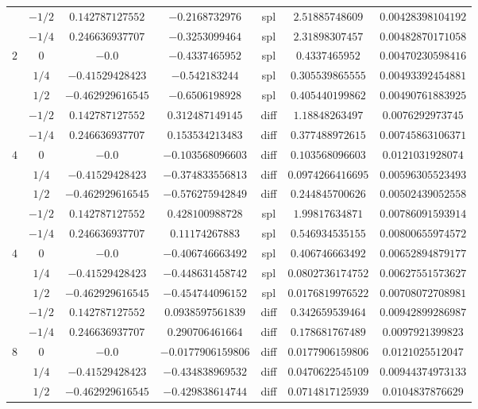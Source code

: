 \documentclass[letter, 10pt]{article}
\begin{document}
\begin{itemize}
\begin{center}
\begin{tabular}{|c|c|c|c|c|c|c|}
			& $ -1/2 $ & $ 0.142787127552 $ & $ -0.2168732976 $ &  spl  & $ 2.51885748609 $ & $ 0.00428398104192 $ \\ 
			& $ -1/4 $ & $ 0.246636937707 $ & $ -0.3253099464 $ &  spl  & $ 2.31898307457 $ & $ 0.00482870171058 $ \\ 
		$2$ & $ 0 $ & $ -0.0 $ & $ -0.4337465952 $ &  spl  & $ 0.4337465952 $ & $ 0.00470230598416 $ \\ 
			& $ 1/4 $ & $ -0.41529428423 $ & $ -0.542183244 $ &  spl  & $ 0.305539865555 $ & $ 0.00493392454881 $ \\ 
			& $ 1/2 $ & $ -0.462929616545 $ & $ -0.6506198928 $ &  spl  & $ 0.405440199862 $ & $ 0.00490761883925 $ \\ 

		\hline \hline
			& $ -1/2 $ & $ 0.142787127552 $ & $ 0.312487149145 $ &  diff  & $ 1.18848263497 $ & $ 0.0076292973745 $ \\ 
			& $ -1/4 $ & $ 0.246636937707 $ & $ 0.153534213483 $ &  diff  & $ 0.377488972615 $ & $ 0.00745863106371 $ \\ 
		$4$ & $ 0 $ & $ -0.0 $ & $ -0.103568096603 $ &  diff  & $ 0.103568096603 $ & $ 0.0121031928074 $ \\ 
			& $ 1/4 $ & $ -0.41529428423 $ & $ -0.374833556813 $ &  diff  & $ 0.0974266416695 $ & $ 0.00596305523493 $ \\ 
			& $ 1/2 $ & $ -0.462929616545 $ & $ -0.576275942849 $ &  diff  & $ 0.244845700626 $ & $ 0.00502439052558 $ \\
		\hline
		
			& $ -1/2 $ & $ 0.142787127552 $ & $ 0.428100988728 $ &  spl  & $ 1.99817634871 $ & $ 0.00786091593914 $ \\ 
			& $ -1/4 $ & $ 0.246636937707 $ & $ 0.11174267883 $ &  spl  & $ 0.546934535155 $ & $ 0.00800655974572 $ \\ 
		$4$ & $ 0 $ & $ -0.0 $ & $ -0.406746663492 $ &  spl  & $ 0.406746663492 $ & $ 0.00652894879177 $ \\ 
			& $ 1/4 $ & $ -0.41529428423 $ & $ -0.448631458742 $ &  spl  & $ 0.0802736174752 $ & $ 0.00627551573627 $ \\ 
			& $ 1/2 $ & $ -0.462929616545 $ & $ -0.454744096152 $ &  spl  & $ 0.0176819976522 $ & $ 0.00708072708981 $ \\ 

		\hline \hline
			& $ -1/2 $ & $ 0.142787127552 $ & $ 0.0938597561839 $ &  diff  & $ 0.342659539464 $ & $ 0.00942899286987 $ \\ 
			& $ -1/4 $ & $ 0.246636937707 $ & $ 0.290706461664 $ &  diff  & $ 0.178681767489 $ & $ 0.0097921399823 $ \\ 
		$8$ & $ 0 $ & $ -0.0 $ & $ -0.0177906159806 $ &  diff  & $ 0.0177906159806 $ & $ 0.0121025512047 $ \\ 
			& $ 1/4 $ & $ -0.41529428423 $ & $ -0.434838969532 $ &  diff  & $ 0.0470622545109 $ & $ 0.00944374973133 $ \\ 
			& $ 1/2 $ & $ -0.462929616545 $ & $ -0.429838614744 $ &  diff  & $ 0.0714817125939 $ & $ 0.0104837876629 $ \\
		\hline
		

\end{tabular}
\end{center}
\end{itemize}
\end{document}
